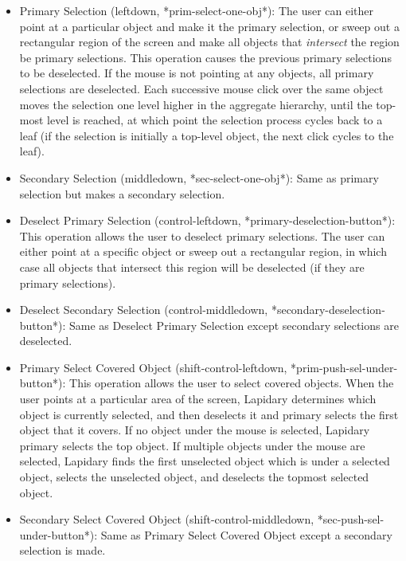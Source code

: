 \begin{itemize}
\item {}
Primary Selection (leftdown, *prim-select-one-obj*): The user can
either point at a particular object
and make it the primary selection, or sweep out a rectangular region of the
screen and make all objects that {\it intersect} the
region be primary selections.
This operation causes the previous primary selections to be deselected. If the
mouse is not pointing at any objects, all primary selections are deselected.
Each successive mouse click over the same object
moves the selection one level higher in
the aggregate
hierarchy, until the top-most level is reached, at which point the
selection process cycles back to a leaf (if the selection is initially a
top-level object, the next click cycles to the leaf).

\item {}
Secondary Selection (middledown, *sec-select-one-obj*): Same as primary
selection but makes a secondary selection.

\item {}
Deselect Primary Selection (control-leftdown, *primary-deselection-button*):
This operation allows the user to deselect primary selections. The user
can either point at a specific object or sweep out a rectangular region,
in which case all objects that intersect this region will be
deselected (if they are primary selections).

\item {}
Deselect Secondary Selection
(control-middledown, *secondary-deselection-button*): Same as Deselect
Primary Selection except secondary selections are deselected.

\item {}
Primary Select Covered Object (shift-control-leftdown,
*prim-push-sel-under-button*): This operation
allows the user to select covered objects. When the user points at a particular
area of the screen, Lapidary determines which object is currently selected,
and then deselects it and primary selects the first object that it covers. If
no object under the mouse is selected, Lapidary primary selects the top object.
If multiple objects under the mouse are selected, Lapidary finds the first
unselected object which is under a selected object, selects the unselected
object, and deselects the topmost selected object.

\item {}
Secondary Select Covered Object (shift-control-middledown,
*sec-push-sel-under-button*): Same as Primary Select Covered Object except
a secondary selection is made.


\end{itemize}
